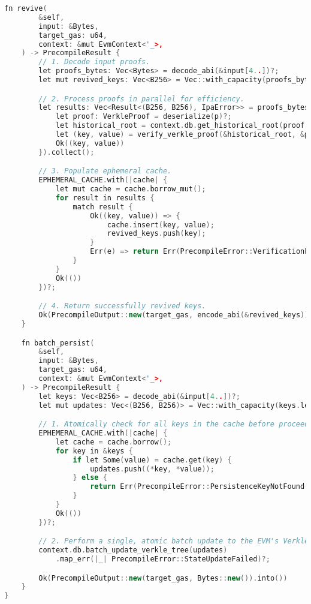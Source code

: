\documentclass{article}
\begin{document}
\begin{lstlisting}[language=C++,caption={Rust Native Precompile Implementation},label={lst:rust}]
    fn revive(
        &self,
        input: &Bytes,
        target_gas: u64,
        context: &mut EvmContext<'_>,
    ) -> PrecompileResult {
        // 1. Decode input proofs.
        let proofs_bytes: Vec<Bytes> = decode_abi(&input[4..])?;
        let mut revived_keys: Vec<B256> = Vec::with_capacity(proofs_bytes.len());

        // 2. Process proofs in parallel for efficiency.
        let results: Vec<Result<(B256, B256), IpaError>> = proofs_bytes.par_iter().map(|p| {
            let proof: VerkleProof = deserialize(p)?;
            let historical_root = context.db.get_historical_root(proof.epoch)?;
            let (key, value) = verify_verkle_proof(&historical_root, &proof)?;
            Ok((key, value))
        }).collect();

        // 3. Populate ephemeral cache.
        EPHEMERAL_CACHE.with(|cache| {
            let mut cache = cache.borrow_mut();
            for result in results {
                match result {
                    Ok((key, value)) => {
                        cache.insert(key, value);
                        revived_keys.push(key);
                    }
                    Err(e) => return Err(PrecompileError::VerificationFailed(e).into()),
                }
            }
            Ok(())
        })?;

        // 4. Return successfully revived keys.
        Ok(PrecompileOutput::new(target_gas, encode_abi(&revived_keys)).into())
    }

    fn batch_persist(
        &self,
        input: &Bytes,
        target_gas: u64,
        context: &mut EvmContext<'_>,
    ) -> PrecompileResult {
        let keys: Vec<B256> = decode_abi(&input[4..])?;
        let mut updates: Vec<(B256, B256)> = Vec::with_capacity(keys.len());

        // 1. Atomically check for all keys in the cache before proceeding.
        EPHEMERAL_CACHE.with(|cache| {
            let cache = cache.borrow();
            for key in &keys {
                if let Some(value) = cache.get(key) {
                    updates.push((*key, *value));
                } else {
                    return Err(PrecompileError::PersistenceKeyNotFound(*key).into());
                }
            }
            Ok(())
        })?;

        // 2. Perform a single, atomic batch update to the EVM's Verkle tree state.
        context.db.batch_update_verkle_tree(updates)
            .map_err(|_| PrecompileError::StateUpdateFailed)?;

        Ok(PrecompileOutput::new(target_gas, Bytes::new()).into())
    }
}
\end{lstlisting}
\end{document}
